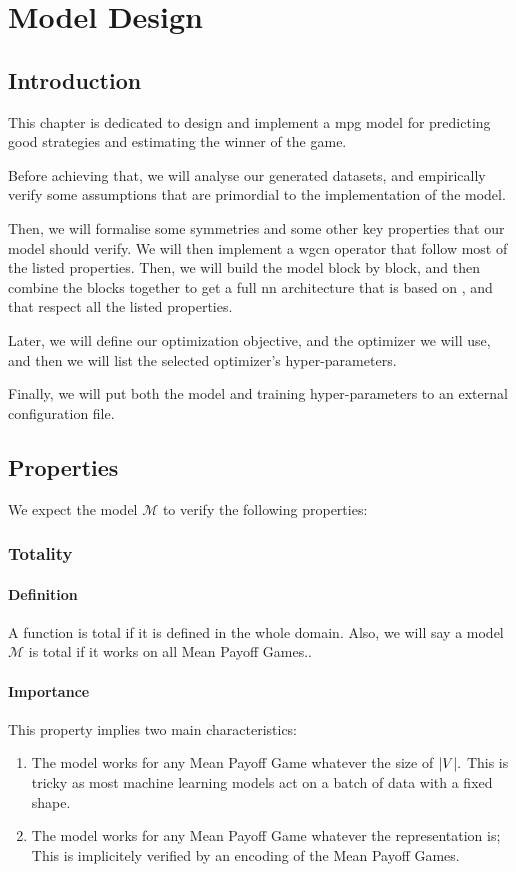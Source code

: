 \chapter{Model Design}
\label{section:ModelDesign}
\label{chapter:ModelDesign}

\section*{Introduction}
This chapter is dedicated to design and implement a \acrshort{mpg} model for predicting good strategies and estimating the winner of the game.

Before achieving that, we will analyse our generated datasets, and empirically verify some assumptions that are primordial to the implementation of the model.

Then, we will formalise some symmetries and some other key properties that our model should verify. We will then implement a \acrfull{wgcn} operator that follow most of the listed properties. Then, we will build the model block by block, and then combine the blocks together to get a full \acrfull{nn} architecture that is based on , and that respect all the listed properties.

Later, we will define our optimization objective, and the optimizer we will use, and then we will list the selected optimizer's hyper-parameters.

Finally, we will put both the model and training hyper-parameters to an external configuration file.

\section{Properties}
\label{section:ModelDesign:Properties}
We expect the model $\mathcal{M}$ to verify the following properties:

\subsection{Totality}
\subsubsection{Definition}
A function is total if it is defined in the whole domain.
\newline Also, we will say a model $\mathcal{M}$ is total if it works on all Mean Payoff Games..
\subsubsection{Importance}
This property implies two main characteristics:
\begin{enumerate}
	\item The model works for any Mean Payoff Game whatever the size of $\lvert V \rvert.$ This is tricky as most machine learning models act on a batch of data with a fixed shape.
	\item The model works for any Mean Payoff Game whatever the representation is; This is implicitely verified by an encoding of the Mean Payoff Games.
\end{enumerate}

